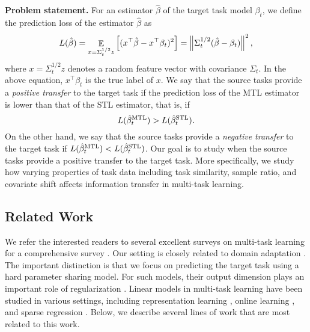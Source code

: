 \medskip
\noindent\textbf{Problem statement.}
For an estimator $\hat{\beta}$ of the target task model $\beta_t$, we define the prediction loss of the estimator $\hat{\beta}$ as
	{\begin{align*}
		L(\hat{\beta}) = \mathop{\mathbb{E}}_{x = \Sigma_t^{1/2} z}\left[ ({x}^{\top}\hat{\beta} - {x}^{\top}\beta_t)^2 \right]
		= \left\| \Sigma_t^{1/2} (\hat{\beta} - \beta_t) \right\|^2,
	\end{align*}}%
where $x = \Sigma_t^{1/2} z$ denotes a random feature vector with covariance $\Sigma_t$.
In the above equation, $x^{\top}\beta_t$ is the true label of $x$.
We say that the source tasks provide a \textit{positive transfer} to the target task if the prediction loss of the MTL estimator is lower than that of the STL estimator, that is, if
	\[ L(\hat{\beta}_t^{\textup{MTL}}) > L(\hat{\beta}_t^{\textup{STL}}). \]
On the other hand, we say that the source tasks provide a \textit{negative transfer} to the target task if $L(\hat{\beta}_t^{\textup{MTL}}) < L(\hat{\beta}_t^{\textup{STL}})$.
Our goal is to study when the source tasks provide a positive transfer to the target task.
More specifically, we study how varying properties of task data including task similarity, sample ratio, and covariate shift affects information transfer in multi-task learning.




\subsection{Related Work}

We refer the interested readers to several excellent surveys on multi-task  learning for a comprehensive survey \cite{PY09,R17,ZY17,V20}.
Our setting is closely related to domain adaptation \cite{DM06,BB07,BC08,DH09,MMR09,CWB11,ZS13,NB17,ZD19}.
The important distinction is that we focus on predicting the target task using a hard parameter sharing model.
For such models, their output dimension plays an important role of regularization \cite{KD12}.
Linear models in multi-task learning have been studied in various settings, including representation learning \cite{BHKL19}, online learning \cite{CCG10,DCSP18}, and sparse regression \cite{LPVT11}.
Below, we describe several lines of work that are most related to this work.

